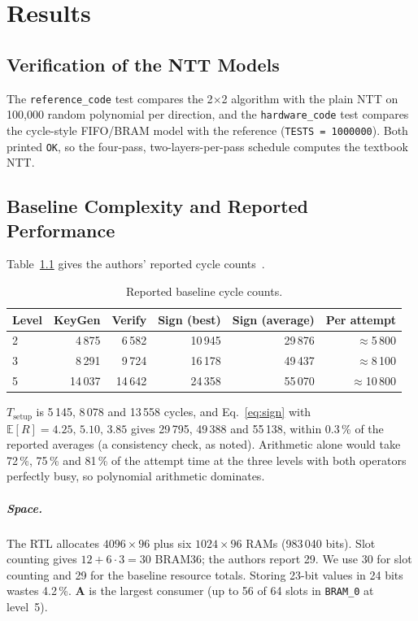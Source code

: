 \documentclass[12pt,a4paper]{report}
\newcommand{\code}[1]{\texttt{#1}}
\begin{document}
\chapter{Results}
\section{Verification of the NTT Models}\label{sec:ntt-check}
The \code{reference\_code} test compares the 2$\times$2 algorithm with the plain NTT on 100{,}000 random polynomial per direction, and the \code{hardware\_code} test compares the cycle-style FIFO/BRAM model with the reference (\code{TESTS = 1000000}). Both printed \texttt{OK}, so the four-pass, two-layers-per-pass schedule computes the textbook NTT.

\section{Baseline Complexity and Reported Performance}\label{sec:baseline}
Table~\ref{tab:perf} gives the authors' reported cycle counts~\cite{beckwith2022}.

\begin{table}[H]
\centering
\caption{Reported baseline cycle counts.}\label{tab:perf}
\begin{tabular}{@{}lrrrrr@{}}
\toprule
Level & KeyGen & Verify & Sign (best) & Sign (average) & Per attempt\\
\midrule
2 &  4\,875 &  6\,582 & 10\,945 & 29\,876 & $\approx$5\,800\\
3 &  8\,291 &  9\,724 & 16\,178 & 49\,437 & $\approx$8\,100\\
5 & 14\,037 & 14\,642 & 24\,358 & 55\,070 & $\approx$10\,800\\
\bottomrule
\end{tabular}
\end{table}

$T_{\text{setup}}$ is 5\,145, 8\,078 and 13\,558 cycles, and Eq.~\eqref{eq:sign} with $\mathbb{E}[R]=4.25,\,5.10,\,3.85$ gives 29\,795, 49\,388 and 55\,138, within 0.3\,\% of the reported averages (a consistency check, as noted). Arithmetic alone would take 72\,\%, 75\,\% and 81\,\% of the attempt time at the three levels with both operators perfectly busy, so polynomial arithmetic dominates.

\paragraph{Space.}
The RTL allocates $4096\times96$ plus six $1024\times96$ RAMs (983\,040 bits). Slot counting gives $12+6\cdot3=30$ BRAM36; the authors report 29. We use 30 for slot counting and 29 for the baseline resource totals. Storing 23-bit values in 24 bits wastes 4.2\,\%. $\mathbf{A}$ is the largest consumer (up to 56 of 64 slots in \code{BRAM\_0} at level~5).
\end{document}
